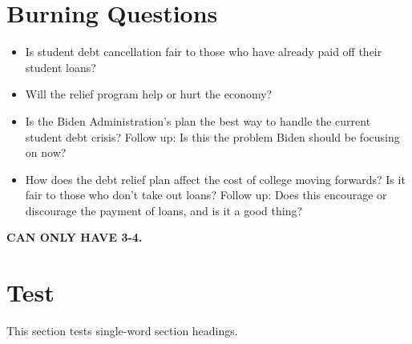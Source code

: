 \documentclass{../khw}
\begin{document}
\section{Burning Questions}

\begin{itemize}
    \item Is student debt cancellation fair to those who have already paid off their student loans?
    \item Will the relief program help or hurt the economy?
    \item Is the Biden Administration's plan the best way to handle the current student debt crisis?
    \nestitem Follow up:   Is this the problem Biden should be focusing on now?

    \item How does the debt relief plan affect the cost of college moving forwards? Is it fair to those who don't take out loans?
    \nestitem Follow up:   Does this encourage or discourage the payment of loans, and is it a good thing?
\end{itemize}

\textbf{CAN ONLY HAVE 3-4.}

\section{Test}
This section tests single-word section headings.
\end{document}
